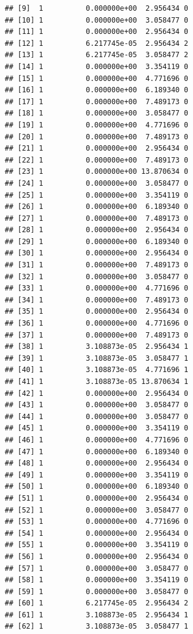 \documentclass[
]{article}
\begin{document}
\begin{verbatim}
## [9]  1          0.000000e+00  2.956434 0    
## [10] 1          0.000000e+00  3.058477 0    
## [11] 1          0.000000e+00  2.956434 0    
## [12] 1          6.217745e-05  2.956434 2    
## [13] 1          6.217745e-05  3.058477 2    
## [14] 1          0.000000e+00  3.354119 0    
## [15] 1          0.000000e+00  4.771696 0    
## [16] 1          0.000000e+00  6.189340 0    
## [17] 1          0.000000e+00  7.489173 0    
## [18] 1          0.000000e+00  3.058477 0    
## [19] 1          0.000000e+00  4.771696 0    
## [20] 1          0.000000e+00  7.489173 0    
## [21] 1          0.000000e+00  2.956434 0    
## [22] 1          0.000000e+00  7.489173 0    
## [23] 1          0.000000e+00 13.870634 0    
## [24] 1          0.000000e+00  3.058477 0    
## [25] 1          0.000000e+00  3.354119 0    
## [26] 1          0.000000e+00  6.189340 0    
## [27] 1          0.000000e+00  7.489173 0    
## [28] 1          0.000000e+00  2.956434 0    
## [29] 1          0.000000e+00  6.189340 0    
## [30] 1          0.000000e+00  2.956434 0    
## [31] 1          0.000000e+00  7.489173 0    
## [32] 1          0.000000e+00  3.058477 0    
## [33] 1          0.000000e+00  4.771696 0    
## [34] 1          0.000000e+00  7.489173 0    
## [35] 1          0.000000e+00  2.956434 0    
## [36] 1          0.000000e+00  4.771696 0    
## [37] 1          0.000000e+00  7.489173 0    
## [38] 1          3.108873e-05  2.956434 1    
## [39] 1          3.108873e-05  3.058477 1    
## [40] 1          3.108873e-05  4.771696 1    
## [41] 1          3.108873e-05 13.870634 1    
## [42] 1          0.000000e+00  2.956434 0    
## [43] 1          0.000000e+00  3.058477 0    
## [44] 1          0.000000e+00  3.058477 0    
## [45] 1          0.000000e+00  3.354119 0    
## [46] 1          0.000000e+00  4.771696 0    
## [47] 1          0.000000e+00  6.189340 0    
## [48] 1          0.000000e+00  2.956434 0    
## [49] 1          0.000000e+00  3.354119 0    
## [50] 1          0.000000e+00  6.189340 0    
## [51] 1          0.000000e+00  2.956434 0    
## [52] 1          0.000000e+00  3.058477 0    
## [53] 1          0.000000e+00  4.771696 0    
## [54] 1          0.000000e+00  2.956434 0    
## [55] 1          0.000000e+00  3.354119 0    
## [56] 1          0.000000e+00  2.956434 0    
## [57] 1          0.000000e+00  3.058477 0    
## [58] 1          0.000000e+00  3.354119 0    
## [59] 1          0.000000e+00  3.058477 0    
## [60] 1          6.217745e-05  2.956434 2    
## [61] 1          3.108873e-05  2.956434 1    
## [62] 1          3.108873e-05  3.058477 1
\end{verbatim}
\end{document}
